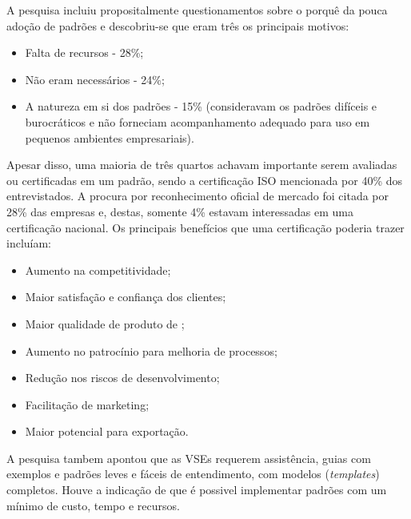 A pesquisa incluiu propositalmente questionamentos sobre o porquê da pouca adoção de padrões e descobriu-se que eram três os principais motivos: 

\begin{itemize}

\item Falta de recursos - 28\%;

\item Não eram necessários - 24\%;

\item A natureza em si dos padrões - 15\% (consideravam os padrões difíceis e burocráticos e não forneciam acompanhamento adequado para uso em pequenos ambientes empresariais).

\end{itemize}

Apesar disso, uma maioria de três quartos achavam importante serem avaliadas ou certificadas em um padrão, sendo a certificação ISO mencionada por 40\% dos entrevistados. A procura por reconhecimento oficial de mercado foi citada por 28\% das empresas e, destas, somente 4\% estavam interessadas em uma certificação nacional. Os principais benefícios que uma certificação poderia trazer incluíam:

\begin{itemize}

\item Aumento na competitividade;

\item Maior satisfação e confiança dos clientes;

\item Maior qualidade de produto de \sw;

\item Aumento no patrocínio para melhoria de processos;

\item Redução nos riscos de desenvolvimento;

\item Facilitação de marketing;

\item Maior potencial para exportação.

\end{itemize}

A pesquisa tambem apontou que as VSEs requerem assistência, guias com exemplos e padrões leves e fáceis de entendimento, com modelos (\textit{templates}) completos. Houve a indicação de que é possivel implementar padrões com um mínimo de custo, tempo e recursos.

